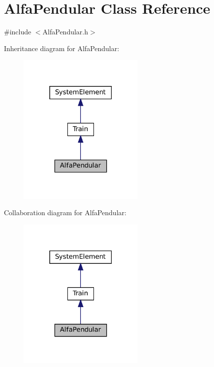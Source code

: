 \hypertarget{classAlfaPendular}{}\section{Alfa\+Pendular Class Reference}
\label{classAlfaPendular}


{\ttfamily \#include $<$Alfa\+Pendular.\+h$>$}



Inheritance diagram for Alfa\+Pendular\+:
\nopagebreak
\begin{figure}[H]
\begin{center}
\leavevmode
\includegraphics[width=174pt]{classAlfaPendular__inherit__graph}
\end{center}
\end{figure}


Collaboration diagram for Alfa\+Pendular\+:
\nopagebreak
\begin{figure}[H]
\begin{center}
\leavevmode
\includegraphics[width=174pt]{classAlfaPendular__coll__graph}
\end{center}
\end{figure}
